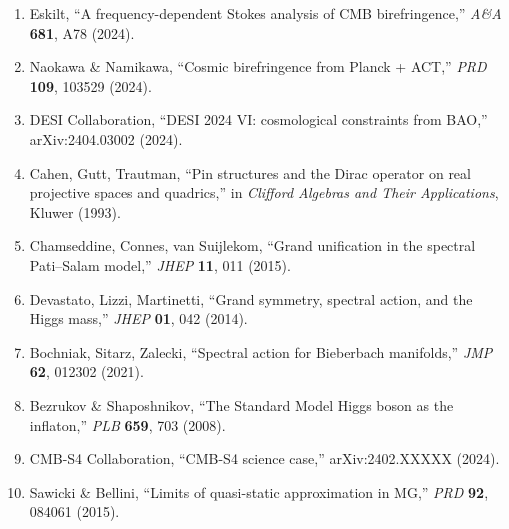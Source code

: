 \documentclass[11pt,a4paper]{article}
\begin{document}
\begin{enumerate}
\item Eskilt, ``A frequency-dependent Stokes analysis of CMB birefringence,'' \textit{A\&A} \textbf{681}, A78 (2024).
\item Naokawa \& Namikawa, ``Cosmic birefringence from Planck + ACT,'' \textit{PRD} \textbf{109}, 103529 (2024).
\item DESI Collaboration, ``DESI 2024 VI: cosmological constraints from BAO,'' arXiv:2404.03002 (2024).
\item Cahen, Gutt, Trautman, ``Pin structures and the Dirac operator on real projective spaces and quadrics,'' in \textit{Clifford Algebras and Their Applications}, Kluwer (1993).
\item Chamseddine, Connes, van Suijlekom, ``Grand unification in the spectral Pati--Salam model,'' \textit{JHEP} \textbf{11}, 011 (2015).
\item Devastato, Lizzi, Martinetti, ``Grand symmetry, spectral action, and the Higgs mass,'' \textit{JHEP} \textbf{01}, 042 (2014).
\item Bochniak, Sitarz, Zalecki, ``Spectral action for Bieberbach manifolds,'' \textit{JMP} \textbf{62}, 012302 (2021).
\item Bezrukov \& Shaposhnikov, ``The Standard Model Higgs boson as the inflaton,'' \textit{PLB} \textbf{659}, 703 (2008).
\item CMB-S4 Collaboration, ``CMB-S4 science case,'' arXiv:2402.XXXXX (2024).
\item Sawicki \& Bellini, ``Limits of quasi-static approximation in MG,'' \textit{PRD} \textbf{92}, 084061 (2015).
\end{enumerate}
\end{document}
